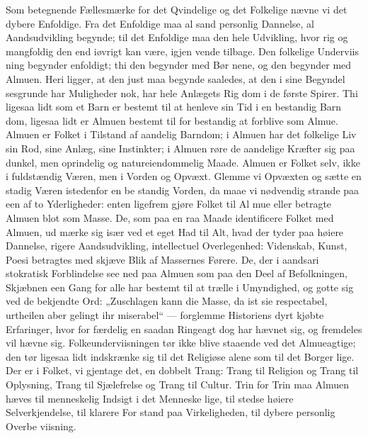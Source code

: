 \documentclass[12pt]{book}
\newcommand{\opage}[1]{\marginnote{\footnotesize\textit{[#1]}}}
\begin{document}
Som betegnende Fællesmærke for det Qvindelige
og det Folkelige nævne vi det dybere Enfoldige. Fra
det Enfoldige maa al sand personlig Dannelse, al
Aandsudvikling begynde; til det Enfoldige maa den
hele Udvikling, hvor rig og mangfoldig den end iøvrigt
kan være, igjen vende tilbage. Den folkelige Underviis\-%
ning begynder enfoldigt; thi den begynder med Bør\-%
nene, og den begynder med Almuen. Heri ligger, at
den just maa begynde saaledes, at den i sine Begyndel\-%
sesgrunde har Muligheder nok, har hele Anlægets Rig\-%
dom i de første Spirer. Thi ligesaa lidt som et Barn
er bestemt til at henleve sin Tid i en bestandig Barn\-%
dom, ligesaa lidt er Almuen bestemt til for bestandig at
forblive som Almue. Almuen er Folket i Tilstand af
aandelig Barndom; i Almuen har det folkelige Liv sin
Rod, sine Anlæg, sine Instinkter; i Almuen røre de
aandelige Kræfter sig paa dunkel, men oprindelig og
natureiendommelig Maade. Almuen er Folket selv, ikke
i fuldstændig Væren, men i Vorden og Opvæxt. Glemme
vi Opvæxten og sætte en stadig Væren istedenfor en be\-%
standig Vorden, da maae vi nødvendig strande paa een
af to Yderligheder: enten ligefrem gjøre Folket til Al\-%
mue eller betragte Almuen blot som Masse. De, som
paa en raa Maade identificere Folket med Almuen, ud\-%
\opage{287}\setcounter{footnote}{0}%
mærke sig især ved et eget Had til Alt, hvad der tyder
paa høiere Dannelse, rigere Aandsudvikling, intellectuel
Overlegenhed: Videnskab, Kunst, Poesi betragtes med
skjæve Blik af Massernes Førere. De, der i aandsari\-%
stokratisk Forblindelse see ned paa Almuen som paa
den Deel af Befolkningen, Skjæbnen een Gang for
alle har bestemt til at trælle i Umyndighed, og gotte
sig ved de bekjendte Ord: „Zuschlagen kann die Masse,
da ist sie respectabel, urtheilen aber gelingt ihr miserabel“ ---
forglemme Historiens dyrt kjøbte Erfaringer, hvor for\-%
færdelig en saadan Ringeagt dog har hævnet sig, og
fremdeles vil hævne sig. Folkeunderviisningen tør ikke
blive staaende ved det Almueagtige; den tør ligesaa lidt
indskrænke sig til det Religiøse alene som til det Borger\-%
lige. Der er i Folket, vi gjentage det, en dobbelt Trang:
Trang til Religion og Trang til Oplysning, Trang
til Sjælefrelse og Trang til Cultur. Trin for Trin maa
Almuen hæves til menneskelig Indsigt i det Menneske\-%
lige, til stedse høiere Selverkjendelse, til klarere For\-%
stand paa Virkeligheden, til dybere personlig Overbe\-%
viisning.
\end{document}
